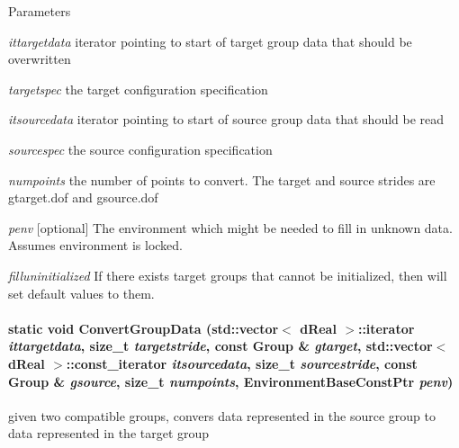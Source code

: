 \begin{DoxyParams}{Parameters}
\item[{\em ittargetdata}]iterator pointing to start of target group data that should be overwritten \item[{\em targetspec}]the target configuration specification \item[{\em itsourcedata}]iterator pointing to start of source group data that should be read \item[{\em sourcespec}]the source configuration specification \item[{\em numpoints}]the number of points to convert. The target and source strides are gtarget.dof and gsource.dof \item[{\em penv}]\mbox{[}optional\mbox{]} The environment which might be needed to fill in unknown data. Assumes environment is locked. \item[{\em filluninitialized}]If there exists target groups that cannot be initialized, then will set default values to them. \end{DoxyParams}
\hypertarget{classOpenRAVE_1_1ConfigurationSpecification_af710011f622dd73b9c7f6d5d1dc9f470}{
\paragraph[{ConvertGroupData}]{\setlength{\rightskip}{0pt plus 5cm}static void ConvertGroupData (std::vector$<$ dReal $>$::iterator {\em ittargetdata}, \/  size\_\-t {\em targetstride}, \/  const {\bf Group} \& {\em gtarget}, \/  std::vector$<$ dReal $>$::const\_\-iterator {\em itsourcedata}, \/  size\_\-t {\em sourcestride}, \/  const {\bf Group} \& {\em gsource}, \/  size\_\-t {\em numpoints}, \/  EnvironmentBaseConstPtr {\em penv})}\hfill}
\label{classOpenRAVE_1_1ConfigurationSpecification_af710011f622dd73b9c7f6d5d1dc9f470}


given two compatible groups, convers data represented in the source group to data represented in the target group 


